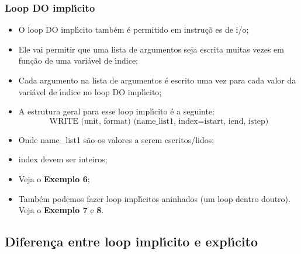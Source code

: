 \documentclass[notes=show]{beamer}
\makeatletter
\newenvironment{stepitemizewithalert}{\begin{itemize}[<+-| alert@+>]}{\end{itemize} }
\makeatother
\begin{document}
\begin{frame}%

\frametitle{Loop DO impl\'{\i}cito}

\begin{stepitemizewithalert}
\item O loop DO impl\'{\i}cito tamb\'{e}m \'{e} permitido em instru\c{c}\~{o}%
es de i/o;

\item Ele vai permitir que uma lista de argumentos seja escrita muitas vezes
em fun\c{c}\~{a}o de uma vari\'{a}vel de \'{\i}ndice;

\item Cada argumento na lista de argumentos \'{e} escrito uma vez para cada
valor da vari\'{a}vel de \'{\i}ndice no loop DO impl\'{\i}cito;

\item A estrutura geral para esse loop impl\'{\i}cito \'{e} a seguinte:%
\[
\text{WRITE (unit, format) (name\_list1, index=istart, iend, istep)} 
\]

\item Onde name\_list1 s\~{a}o os valores a serem escritos/lidos;

\item index devem ser inteiros;

\item Veja o \textbf{Exemplo 6};

\item Tamb\'{e}m podemos fazer loop impl\'{\i}citos aninhados (um loop
dentro doutro). Veja o \textbf{Exemplo 7} e \textbf{8}.
\end{stepitemizewithalert}

\transboxout%
\end{frame}%

\subsection{Diferen\c{c}a entre loop impl\'{\i}cito e expl\'{\i}cito}
\end{document}
